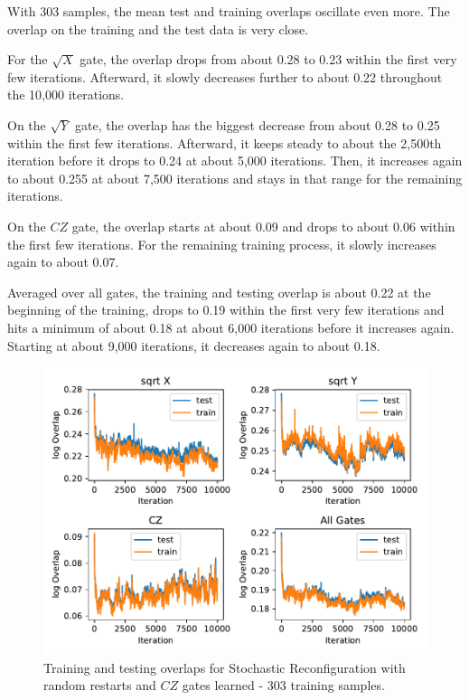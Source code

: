 With 303 samples, the mean test and training overlaps oscillate even more. The overlap on the training and the 
test data is very close. 

For the $\sqrt{X}$ gate, the overlap drops from about 0.28 to 0.23 within the first very few iterations. 
Afterward, it slowly decreases further to about 0.22 throughout the 10,000 iterations.

On the $\sqrt{Y}$ gate, the overlap has the biggest decrease from about 0.28 to 0.25 within the first 
few iterations. Afterward, it keeps steady to about the 2,500th iteration before it drops to 0.24 at about 5,000 iterations.
Then, it increases again to about 0.255 at about 7,500 iterations and stays in that range for the remaining iterations.

On the $CZ$ gate, the overlap starts at about 0.09 and drops to about 0.06 within the first few iterations. 
For the remaining training process, it slowly increases again to about 0.07. 

Averaged over all gates, the training and testing overlap is about 0.22 at the beginning of the training, 
drops to 0.19 within the first very few iterations and hits a minimum of about 0.18 at about 6,000 iterations before 
it increases again. Starting at about 9,000 iterations, it decreases again to about 0.18.

\begin{figure}[H]
  \centering
  \includegraphics[width=\textwidth]{figures/results/sr-restarts-learned/avgOverlap_303.pdf}
  \caption[Training and Testing Overlaps for Stochastic Reconfiguration with Random Restarts and $CZ$ Gates Learned - 303 Samples]{
  Training and testing overlaps for Stochastic Reconfiguration with random restarts and $CZ$ gates learned - 303 training samples.}
  \label{fig:sr_restarts_overlap_303}
\end{figure}

